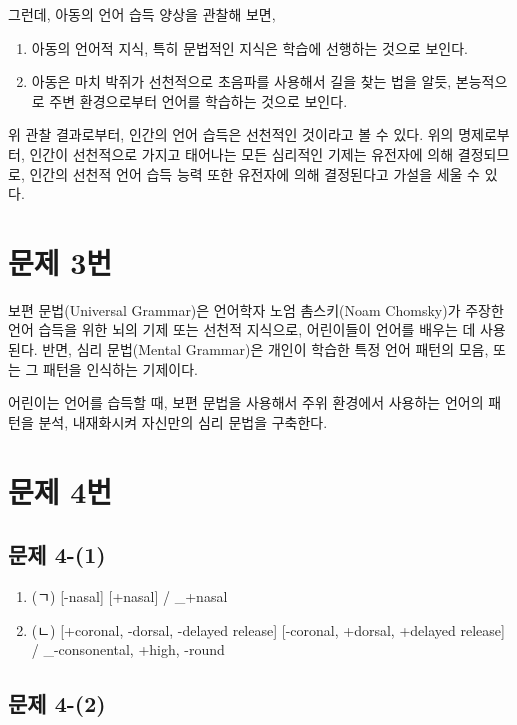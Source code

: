 \documentclass{article}
\begin{document}
        그런데, 아동의 언어 습득 양상을 관찰해 보면,
        \begin{enumerate}
            \item 아동의 언어적 지식, 특히 문법적인 지식은 학습에 선행하는 것으로 보인다.
            \item 아동은 마치 박쥐가 선천적으로 초음파를 사용해서 길을 찾는 법을 알듯, 본능적으로 주변 환경으로부터 언어를 학습하는 것으로 보인다.
        \end{enumerate}
        
        위 관찰 결과로부터, 인간의 언어 습득은 선천적인 것이라고 볼 수 있다. 위의 명제로부터, 인간이 선천적으로 가지고 태어나는 모든 심리적인 기제는 유전자에 의해 결정되므로, 인간의 선천적 언어 습득 능력 또한 유전자에 의해 결정된다고 가설을 세울 수 있다.
        
    \section{문제 3번}
    
        보편 문법(Universal Grammar)은 언어학자 노엄 촘스키(Noam Chomsky)가 주장한 언어 습득을 위한 뇌의 기제 또는 선천적 지식으로, 어린이들이 언어를 배우는 데 사용된다. 반면, 심리 문법(Mental Grammar)은 개인이 학습한 특정 언어 패턴의 모음, 또는 그 패턴을 인식하는 기제이다.
        
        어린이는 언어를 습득할 때, 보편 문법을 사용해서 주위 환경에서 사용하는 언어의 패턴을 분석, 내재화시켜 자신만의 심리 문법을 구축한다.
        
    \section{문제 4번}
    
        \subsection{문제 4-(1)}
            
            \begin{enumerate}
                \item (ㄱ) [-nasal] \textrightarrow{} [+nasal] / \_+nasal
                \item (ㄴ) [+coronal, -dorsal, -delayed release] \textrightarrow{} [-coronal, +dorsal, +delayed release] / \_-consonental, +high, -round
            \end{enumerate}
            
        \subsection{문제 4-(2)}
            
\end{document}
